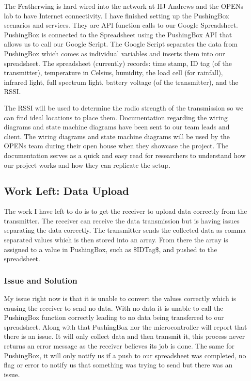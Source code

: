 \documentclass[onecolumn, draftclsnofoot,10pt, compsoc]{IEEEtran}
\begin{document}
The Featherwing is hard wired into the network at HJ Andrews and the OPENs lab to have Internet connectivity.  I have finished setting up the PushingBox scenarios and services.  They are API function calls to our Google Spreadsheet.  PushingBox is connected to the Spreadsheet using the PushingBox API that allows us to call our Google Script.  The Google Script separates the data from PushingBox which comes as individual variables and inserts them into our spreadsheet.  The spreadsheet (currently) records: time stamp, ID tag (of the transmitter), temperature in Celsius, humidity, the load cell (for rainfall), infrared light, full spectrum light, battery voltage (of the transmitter), and the RSSI. 

The RSSI will be used to determine the radio strength of the transmission so we can find ideal locations to place them.  Documentation regarding the wiring diagrams and state machine diagrams have been sent to our team leads and client.  The wiring diagrams and state machine diagrams will be used by the OPENs team during their open house when they showcase the project.  The documentation serves as a quick and easy read for researchers to understand how our project works and how they can replicate the setup.\\

\subsection{Work Left: Data Upload}
The work I have left to do is to get the receiver to upload data correctly from the transmitter.  The receiver can receive the data transmission but is having issues separating the data correctly.  The transmitter sends the collected data as comma separated values which is then stored into an array.  From there the array is assigned to a value in PushingBox, such as \$IDTag\$, and pushed to the spreadsheet. 

\subsubsection{Issue and Solution}
My issue right now is that it is unable to convert the values correctly which is causing the receiver to send no data.  With no data it is unable to call the PushingBox function correctly leading to no data being transferred to our spreadsheet.  Along with that PushingBox nor the microcontroller will report that there is an issue.  It will only collect data and then transmit it, this process never returns an error message as the receiver believes its job is done.  The same for PushingBox, it will only notify us if a push to our spreadsheet was completed, no flag or error to notify us that something was trying to send but there was an issue. 
\end{document}
